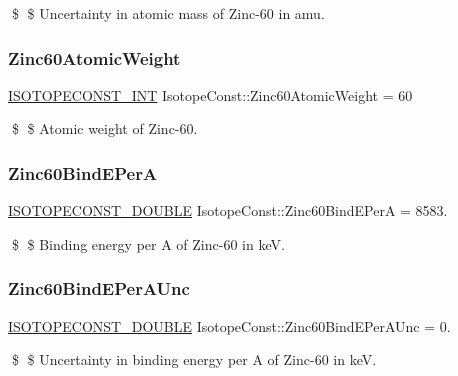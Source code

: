 \$ \$ Uncertainty in atomic mass of Zinc-\/60 in amu. \mbox{\label{group___isotope_const-_zinc-_zn60_gac8e630854ef99595f8dd6fb6c91dec13}} 
\subsubsection{\texorpdfstring{Zinc60\+Atomic\+Weight}{Zinc60AtomicWeight}}
{\footnotesize\ttfamily \mbox{\hyperlink{group___isotope_const-_macros_ga5f18360b3e99483a35c32d789e62621c}{I\+S\+O\+T\+O\+P\+E\+C\+O\+N\+S\+T\+\_\+\+I\+NT}} Isotope\+Const\+::\+Zinc60\+Atomic\+Weight = 60}

\$ \$ Atomic weight of Zinc-\/60. \mbox{\label{group___isotope_const-_zinc-_zn60_gad6f5fb22d868126d8c1756e86c269e8e}} 
\subsubsection{\texorpdfstring{Zinc60\+Bind\+E\+PerA}{Zinc60BindEPerA}}
{\footnotesize\ttfamily \mbox{\hyperlink{group___isotope_const-_macros_ga8f45a7272ce02c0b4c65c44636ed719a}{I\+S\+O\+T\+O\+P\+E\+C\+O\+N\+S\+T\+\_\+\+D\+O\+U\+B\+LE}} Isotope\+Const\+::\+Zinc60\+Bind\+E\+PerA = 8583.}

\$ \$ Binding energy per A of Zinc-\/60 in keV. \mbox{\label{group___isotope_const-_zinc-_zn60_ga8b7534b44d1d176b885a983c5440692a}} 
\subsubsection{\texorpdfstring{Zinc60\+Bind\+E\+Per\+A\+Unc}{Zinc60BindEPerAUnc}}
{\footnotesize\ttfamily \mbox{\hyperlink{group___isotope_const-_macros_ga8f45a7272ce02c0b4c65c44636ed719a}{I\+S\+O\+T\+O\+P\+E\+C\+O\+N\+S\+T\+\_\+\+D\+O\+U\+B\+LE}} Isotope\+Const\+::\+Zinc60\+Bind\+E\+Per\+A\+Unc = 0.}

\$ \$ Uncertainty in binding energy per A of Zinc-\/60 in keV. \mbox{\label{group___isotope_const-_zinc-_zn60_ga7af7b207caa69832bbd8e9c2f396b1af}} 
